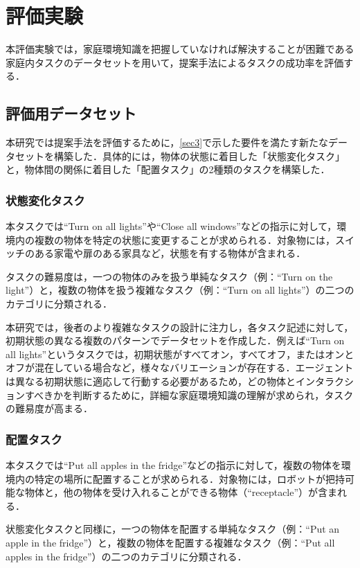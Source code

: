 \section{評価実験}\label{sec5}

本評価実験では，家庭環境知識を把握していなければ解決することが困難である家庭内タスクのデータセットを用いて，提案手法によるタスクの成功率を評価する．

\subsection{評価用データセット}\label{sec5.1}
本研究では提案手法を評価するために，\ref{sec3}で示した要件を満たす新たなデータセットを構築した．具体的には，物体の状態に着目した「状態変化タスク」と，物体間の関係に着目した「配置タスク」の2種類のタスクを構築した．

\subsubsection{状態変化タスク}
本タスクでは``Turn on all lights''や``Close all windows''などの指示に対して，環境内の複数の物体を特定の状態に変更することが求められる．対象物には，スイッチのある家電や扉のある家具など，状態を有する物体が含まれる．

タスクの難易度は，一つの物体のみを扱う単純なタスク（例：``Turn on the light''）と，複数の物体を扱う複雑なタスク（例：``Turn on all lights''）の二つのカテゴリに分類される．

本研究では，後者のより複雑なタスクの設計に注力し，各タスク記述に対して，初期状態の異なる複数のパターンでデータセットを作成した．例えば``Turn on all lights''というタスクでは，初期状態がすべてオン，すべてオフ，またはオンとオフが混在している場合など，様々なバリエーションが存在する．エージェントは異なる初期状態に適応して行動する必要があるため，どの物体とインタラクションすべきかを判断するために，詳細な家庭環境知識の理解が求められ，タスクの難易度が高まる．

\subsubsection{配置タスク}
本タスクでは``Put all apples in the fridge''などの指示に対して，複数の物体を環境内の特定の場所に配置することが求められる．対象物には，ロボットが把持可能な物体と，他の物体を受け入れることができる物体（``receptacle''）が含まれる．

状態変化タスクと同様に，一つの物体を配置する単純なタスク（例：``Put an apple in the fridge''）と，複数の物体を配置する複雑なタスク（例：``Put all apples in the fridge''）の二つのカテゴリに分類される．


